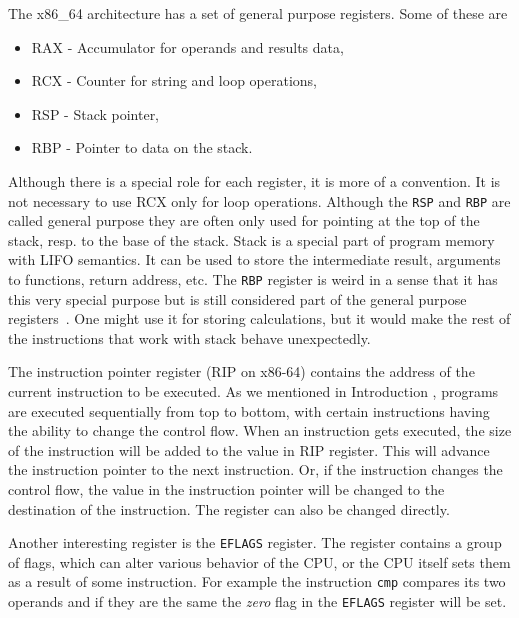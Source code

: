 The x86\_64 architecture has a set of general purpose registers.
Some of these are
\begin{itemize}
    \item RAX - Accumulator for operands and results data,
    \item RCX - Counter for string and loop operations,
    \item RSP - Stack pointer,
    \item RBP - Pointer to data on the stack.
\end{itemize}
Although there is a special role for each register, it is more of a convention.
It is not necessary to use RCX only for loop operations. Although the
\texttt{RSP} and \texttt{RBP} are called general purpose they are often only
used for pointing at the top of the stack, resp. to the base of the stack.
Stack is a special part of program memory with LIFO semantics. It can be used
to store the intermediate result, arguments to functions, return address, etc.
The \texttt{RBP} register is weird in a sense that it has this very special
purpose but is still considered part of the general purpose
registers~\cite{intel-manual}. One might use it for storing calculations, but
it would make the rest of the instructions that work with stack behave
unexpectedly.

The instruction pointer register (RIP on x86-64) contains the address of the
current instruction to be executed. As we mentioned in Introduction ,
programs are executed sequentially from top to bottom, with certain
instructions having the ability to change the control flow. When an instruction
gets executed, the size of the instruction will be added to the value in RIP
register. This will advance the instruction pointer to the next instruction.
Or, if the instruction changes the control flow, the value in the instruction
pointer will be changed to the destination of the instruction. The register can
also be changed directly.

Another interesting register is the \texttt{EFLAGS} register. The register
contains a group of flags, which can alter various behavior of the CPU, or the
CPU itself sets them as a result of some instruction. For example the
instruction \texttt{cmp} compares its two operands and if they are the same the
\textit{zero} flag in the \texttt{EFLAGS} register will be set.

